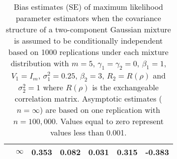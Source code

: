 \documentclass[10pt]{article}
\begin{document}
\begin{table}[ht]
\begin{center}
\begin{tabular}{llccccc}
    & $\infty$ & 0.353 & 0.082 & 0.031 & 0.315 & -0.383 \\ 
   \hline\end{tabular}
\caption{Bias estimates (SE) of maximum likelihood parameter estimators when the covariance structure of a two-component Gaussian mixture is assumed to be conditionally independent based on 1000 replications under each mixture distribution with $m=5$, $\gamma_1=\gamma_2=0$, $\beta_{1}=1$, $V_1=I_{m}$, $\sigma_1^{2}=0.25$, $\beta_2=3$, $R_2=R(\rho)$ and $\sigma_2^{2}=1$ where $R(\rho)$ is the exchangeable correlation matrix. Asymptotic estimates ($n=\infty$) are based on one replication with $n=100,000$. Values equal to zero represent values less than 0.001.}
\label{tab:dep1}
\end{center}
\end{table}\clearpage
\end{document}
